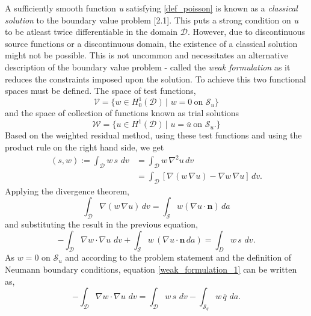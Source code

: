\documentclass[../main.tex]{subfiles}
\begin{document}
A sufficiently smooth function \emph{u} satisfying \eqref{def_poisson} is known as a \emph{classical solution} to the boundary value problem [2.1].
 This puts a strong condition on \emph{u} to be atleast twice differentiable in the domain $\mathcal{D}$.
However, due to discontinuous source functions or a discontinuous domain, the existence of a classical solution might not be possible.
This is not uncommon and necessitates an alternative description of the boundary value problem
 - called the \emph{weak formulation} as it reduces the constraints imposed upon the solution.
To achieve this two functional spaces must be defined. The space of test functions,
\begin{equation} \label{test_space}
    \mathcal{V} = \{
        w \in H^{1}_{0}(\mathcal{D}) \, | \, \, w = 0 \ \text{on $\mathcal{S}_{u}$}
        \}
\end{equation}
and the space of collection of functions known as trial solutions
\begin{equation} \label{solution_space}
    \mathcal{W} = \{
        u \in H^{1}(\mathcal{D}) \, | \,\, u = \overline{u} \ \text{on $\mathcal{S}_{u}$}.
        \}
\end{equation}
%
Based on the weighted residual method, using these test functions and using the product rule on the right hand side, we get
\begin{align*}
    (s, w) := \int_{\mathcal{D}}  w\, s\,\, dv &= \int_{\mathcal{D}} w \, \nabla^{2} u \,dv\\
    &= \int_{\mathcal{D}}[\nabla(w \, \nabla u) - \nabla w \, \nabla u] \,dv.
\end{align*} 
Applying the divergence theorem,
\begin{equation}
    \int_{\mathcal{D}} \nabla(w \, \nabla u) \,dv = \int_{\mathcal{S}} w (\nabla u \cdot \boldsymbol{n}) \,da
\end{equation}
and substituting the result in the previous equation,
\begin{equation} \label{weak_formulation_1}
    -\int_{\mathcal{D}} \nabla w \cdot \nabla u \, \,dv + 
        \int_{\mathcal{S}} w \,(\nabla u \cdot \boldsymbol{n} \,da)  =  \int_{D} w \, s \, \,dv.
\end{equation}
As $w = 0$ on $\mathcal{S}_{u}$ and according to the problem statement and the definition of Neumann boundary conditions, equation
 \eqref{weak_formulation_1} can be written as,
\begin{equation} \label{weak_formulation_2}
    - \int_{\mathcal{D}} \nabla w \cdot \nabla u \, \,dv = \int_{\mathcal{D}} w \, s \,\,dv - \int_{\mathcal{S}_{q}} w \, \overline{q} \,\,da.
\end{equation}
\end{document}
